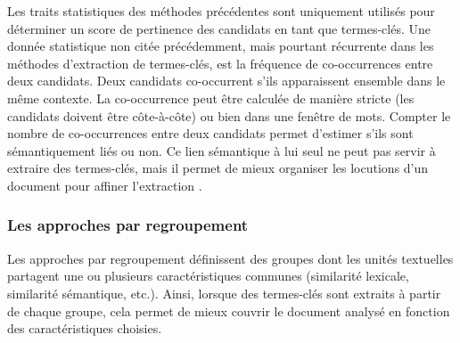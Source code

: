         Les traits statistiques des méthodes précédentes sont uniquement
        utilisés pour déterminer un score de pertinence des candidats en tant
        que termes-clés. Une donnée statistique non citée précédemment, mais
        pourtant récurrente dans les méthodes d'extraction de termes-clés, est
        la fréquence de co-occurrences entre deux candidats. Deux candidats
        co-occurrent s'ils apparaissent ensemble dans le même contexte. La
        co-occurrence peut être calculée de manière stricte (les candidats
        doivent être côte-à-côte) ou bien dans une fenêtre de mots. Compter le
        nombre de co-occurrences entre deux candidats permet d'estimer s'ils
        sont sémantiquement liés ou non. Ce lien sémantique à lui seul ne peut
        pas servir à extraire des termes-clés, mais il permet de mieux
        organiser les locutions d'un document pour affiner l'extraction
        \cite{matsuo2004wordcooccurrence, liu2009keycluster,
        mihalcea2004textrank}.

      \subsubsection{Les approches par regroupement}
      \label{subsubsec:main-state_of_the_art-automatic_keyphrase_extraction-unsupervised_keyphrase_extraction-clustering_approaches}
        Les approches par regroupement définissent des groupes dont les unités textuelles partagent une ou
        plusieurs caractéristiques communes (similarité lexicale, similarité
        sémantique, etc.). Ainsi, lorsque des termes-clés sont extraits à
        partir de chaque groupe, cela permet de mieux couvrir le document
        analysé en fonction des caractéristiques choisies.

